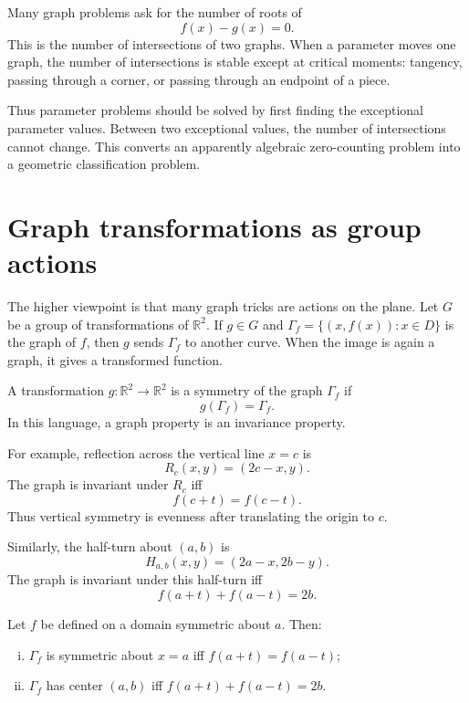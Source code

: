 Many graph problems ask for the number of roots of
\[
  f(x)-g(x)=0.
\]
This is the number of intersections of two graphs.  When a parameter moves one graph, the number of intersections is stable except at critical moments: tangency, passing through a corner, or passing through an endpoint of a piece.

Thus parameter problems should be solved by first finding the exceptional parameter values.  Between two exceptional values, the number of intersections cannot change.  This converts an apparently algebraic zero-counting problem into a geometric classification problem.

\section{Graph transformations as group actions}

The higher viewpoint is that many graph tricks are actions on the plane.  Let \(G\) be a group of transformations of \(\mathbb R^2\).  If \(g\in G\) and \(\Gamma_f=\{(x,f(x)):x\in D\}\) is the graph of \(f\), then \(g\) sends \(\Gamma_f\) to another curve.  When the image is again a graph, it gives a transformed function.

\begin{definition}
A transformation \(g:\mathbb R^2\to\mathbb R^2\) is a symmetry of the graph \(\Gamma_f\) if
\[
  g(\Gamma_f)=\Gamma_f.
\]
In this language, a graph property is an invariance property.
\end{definition}

For example, reflection across the vertical line \(x=c\) is
\[
  R_c(x,y)=(2c-x,y).
\]
The graph is invariant under \(R_c\) iff
\[
  f(c+t)=f(c-t).
\]
Thus vertical symmetry is evenness after translating the origin to \(c\).

Similarly, the half-turn about \((a,b)\) is
\[
  H_{a,b}(x,y)=(2a-x,2b-y).
\]
The graph is invariant under this half-turn iff
\[
  f(a+t)+f(a-t)=2b.
\]

\begin{proposition}
Let \(f\) be defined on a domain symmetric about \(a\).  Then:
\begin{enumerate}[(i)]
  \item \(\Gamma_f\) is symmetric about \(x=a\) iff \(f(a+t)=f(a-t)\);
  \item \(\Gamma_f\) has center \((a,b)\) iff \(f(a+t)+f(a-t)=2b\).
\end{enumerate}
\end{proposition}

